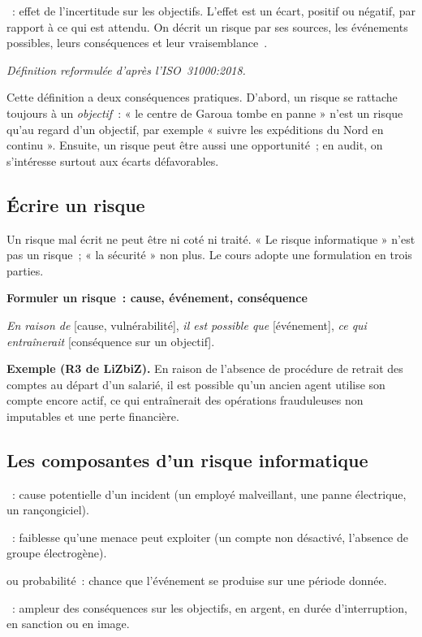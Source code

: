 \begin{boxdef}
~: effet de l'incertitude sur les objectifs.
L'effet est un écart, positif ou négatif, par rapport à ce qui est attendu.
On décrit un risque par ses sources, les événements possibles, leurs
conséquences et leur vraisemblance~\cite{iso31000_2018}.
\end{boxdef}
{\small\itshape Définition reformulée d'après l'ISO~31000:2018.}

\medskip

Cette définition a deux conséquences pratiques. D'abord, un risque se
rattache toujours à un \emph{objectif}~: « le centre de Garoua tombe en
panne » n'est un risque qu'au regard d'un objectif, par exemple « suivre
les expéditions du Nord en continu ». Ensuite, un risque peut être aussi
une opportunité~; en audit, on s'intéresse surtout aux écarts défavorables.

\subsection{Écrire un risque}

Un risque mal écrit ne peut être ni coté ni traité. « Le risque
informatique » n'est pas un risque~; « la sécurité » non plus. Le cours
adopte une formulation en trois parties.

\begin{boxprocedure}
\textbf{Formuler un risque~: cause, événement, conséquence}

\textit{En raison de} [cause, vulnérabilité], \textit{il est possible que}
[événement], \textit{ce qui entraînerait} [conséquence sur un objectif].

\medskip
\textbf{Exemple (R3 de LiZbiZ).} En raison de l'absence de procédure de
retrait des comptes au départ d'un salarié, il est possible qu'un ancien
agent utilise son compte encore actif, ce qui entraînerait des opérations
frauduleuses non imputables et une perte financière.
\end{boxprocedure}

\subsection{Les composantes d'un risque informatique}

\begin{boxdef}
~: cause potentielle d'un incident (un employé
malveillant, une panne électrique, un rançongiciel).

\medskip
{}~: faiblesse qu'une menace peut
exploiter (un compte non désactivé, l'absence de groupe électrogène).

\medskip
{} ou probabilité~: chance que
l'événement se produise sur une période donnée.

\medskip
{}~: ampleur des conséquences sur les
objectifs, en argent, en durée d'interruption, en sanction ou en image.
\end{boxdef}

